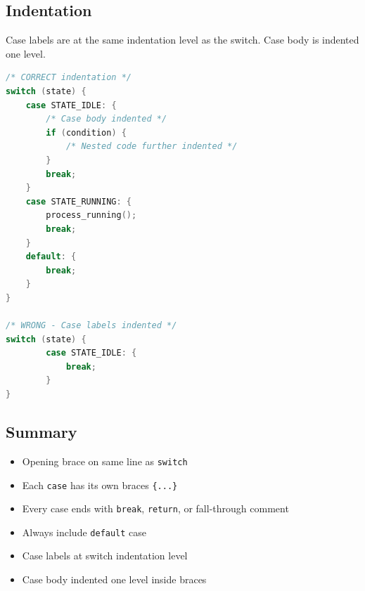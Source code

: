 \subsection{Indentation}

Case labels are at the same indentation level as the switch. Case body is indented one level.

\begin{lstlisting}[language=C]
/* CORRECT indentation */
switch (state) {
    case STATE_IDLE: {
        /* Case body indented */
        if (condition) {
            /* Nested code further indented */
        }
        break;
    }
    case STATE_RUNNING: {
        process_running();
        break;
    }
    default: {
        break;
    }
}

/* WRONG - Case labels indented */
switch (state) {
        case STATE_IDLE: {
            break;
        }
}
\end{lstlisting}

\subsection{Summary}

\begin{itemize}
    \item Opening brace on same line as \texttt{switch}
    \item Each \texttt{case} has its own braces \texttt{\{...\}}
    \item Every case ends with \texttt{break}, \texttt{return}, or fall-through comment
    \item Always include \texttt{default} case
    \item Case labels at switch indentation level
    \item Case body indented one level inside braces
\end{itemize}

